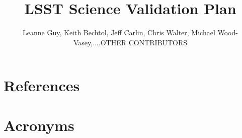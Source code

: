 \documentclass[DM,lsstdraft,toc]{lsstdoc}
\title{LSST Science Validation Plan}
\author{%
Leanne Guy, Keith Bechtol, Jeff Carlin, Chris Walter, Michael Wood-Vasey,....OTHER CONTRIBUTORS
}
\date{\vcsDate}
\begin{document}
\maketitle




\appendix
\section{References} \label{sec:bib}
\renewcommand{\refname}{} %


\section{Acronyms} \label{sec:acronyms}

\end{document}
